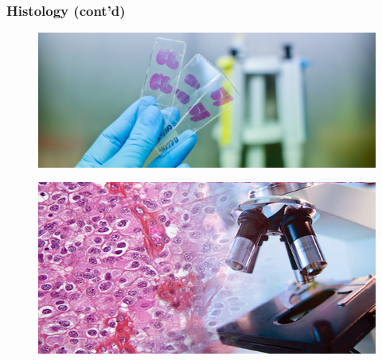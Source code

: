 \message{ !name(presentation.tex)}\documentclass[usenames,dvipsnames]{beamer}
\begin{document}
\begin{frame}
  \frametitle{Histology (cont'd)}
  \begin{figure}[ht]
    \centering
    \includegraphics[width=1.0\textwidth,height=0.3\textheight]{figures/slide.jpg}
    \caption*{\label{fig:slide}}
  \end{figure}
  \vspace{-1.4cm}
  \begin{figure}[ht]
    \centering
    \includegraphics[width=1.0\textwidth,height=0.45\textheight]{figures/slide_microscope.jpg}
    \caption*{\label{fig:slide}}
  \end{figure}
\end{frame}
\end{document}
